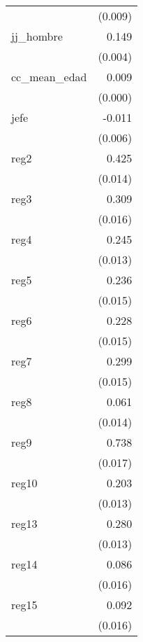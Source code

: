{\begin{longtable}{l*{1}{D{.}{.}{-1}}}
            &     (0.009)         \\
\addlinespace
jj\_hombre   &       0.149\sym{***}\\
            &     (0.004)         \\
\addlinespace
cc\_mean\_edad&       0.009\sym{***}\\
            &     (0.000)         \\
\addlinespace
jefe        &      -0.011         \\
            &     (0.006)         \\
\addlinespace
reg2        &       0.425\sym{***}\\
            &     (0.014)         \\
\addlinespace
reg3        &       0.309\sym{***}\\
            &     (0.016)         \\
\addlinespace
reg4        &       0.245\sym{***}\\
            &     (0.013)         \\
\addlinespace
reg5        &       0.236\sym{***}\\
            &     (0.015)         \\
\addlinespace
reg6        &       0.228\sym{***}\\
            &     (0.015)         \\
\addlinespace
reg7        &       0.299\sym{***}\\
            &     (0.015)         \\
\addlinespace
reg8        &       0.061\sym{***}\\
            &     (0.014)         \\
\addlinespace
reg9        &       0.738\sym{***}\\
            &     (0.017)         \\
\addlinespace
reg10       &       0.203\sym{***}\\
            &     (0.013)         \\
\addlinespace
reg13       &       0.280\sym{***}\\
            &     (0.013)         \\
\addlinespace
reg14       &       0.086\sym{***}\\
            &     (0.016)         \\
\addlinespace
reg15       &       0.092\sym{***}\\
            &     (0.016)         \\

\end{longtable}}
